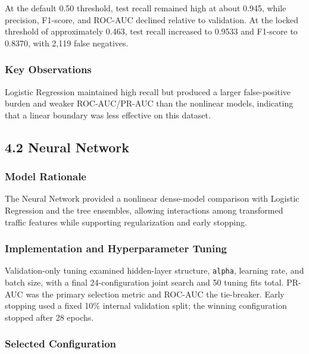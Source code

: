 \documentclass[
  canadian,
  12pt,
]{article}
\let\reportOrigSubsection\subsection
\renewcommand{\subsection}{\par\Needspace*{8\baselineskip}\reportOrigSubsection}%
\let\reportOrigSubsubsection\subsubsection
\renewcommand{\subsubsection}{\par\Needspace*{5\baselineskip}\reportOrigSubsubsection}%
\begin{document}
At the default 0.50 threshold, test recall remained high at about 0.945,
while precision, F1-score, and ROC-AUC declined relative to validation.
At the locked threshold of approximately 0.463, test recall increased to
0.9533 and F1-score to 0.8370, with 2,119 false negatives.

\subsubsection{Key Observations}\label{key-observations}

Logistic Regression maintained high recall but produced a larger
false-positive burden and weaker ROC-AUC/PR-AUC than the nonlinear
models, indicating that a linear boundary was less effective on this
dataset.

\subsection[\texorpdfstring{\numberline{4.2}Neural Network}{4.2 Neural Network}]{4.2 Neural Network}\label{sec-4-2}

\subsubsection{Model Rationale}\label{model-rationale-1}

The Neural Network provided a nonlinear dense-model comparison with
Logistic Regression and the tree ensembles, allowing interactions among
transformed traffic features while supporting regularization and early
stopping.

\subsubsection{Implementation and Hyperparameter
Tuning}\label{implementation-and-hyperparameter-tuning-1}

Validation-only tuning examined hidden-layer structure, \texttt{alpha},
learning rate, and batch size, with a final 24-configuration joint
search and 50 tuning fits total. PR-AUC was the primary selection metric
and ROC-AUC the tie-breaker. Early stopping used a fixed 10\% internal
validation split; the winning configuration stopped after 28 epochs.

\subsubsection{Selected Configuration}\label{selected-configuration-1}
\end{document}
